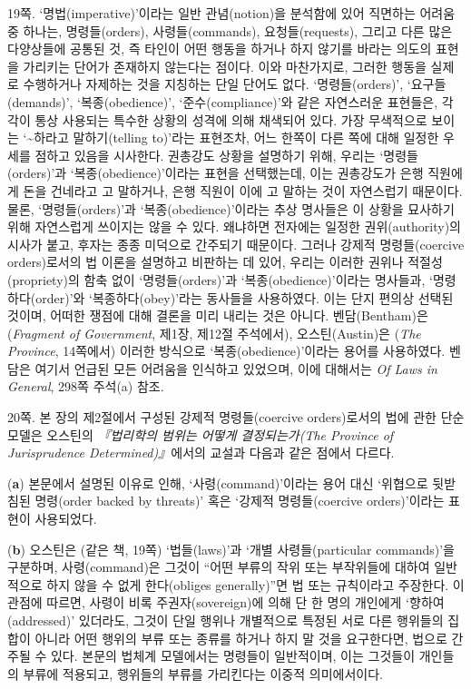 {\noteentry 19쪽.  ‘명법(imperative)’이라는 일반 관념(notion)을 분석함에 있어 직면하는
어려움 중 하나는, 명령들(orders), 사령들(commands), 요청들(requests),
그리고 다른 많은 다양상들에 공통된 것, 즉 타인이 어떤 행동을 하거나 하지
않기를 바라는 의도의 표현을 가리키는 단어가 존재하지 않는다는 점이다.
이와 마찬가지로, 그러한 행동을 실제로 수행하거나 자제하는 것을 지칭하는
단일 단어도 없다. ‘명령들(orders)’, ‘요구들(demands)’,
‘복종(obedience)’, ‘준수(compliance)’와 같은 자연스러운 표현들은, 각각이
통상 사용되는 특수한 상황의 성격에 의해 채색되어 있다. 가장 무색적으로
보이는 ‘\textasciitilde 하라고 말하기(telling to)’라는 표현조차, 어느
한쪽이 다른 쪽에 대해 일정한 우세를 점하고 있음을 시사한다. 권총강도
상황을 설명하기 위해, 우리는 ‘명령들(orders)’과 ‘복종(obedience)’이라는
표현을 선택했는데, 이는 권총강도가 은행 직원에게 돈을 건네라고
고 말하거나, 은행 직원이 이에
고 말하는 것이 자연스럽기 때문이다. 물론,
‘명령들(orders)’과 ‘복종(obedience)’이라는 추상 명사들은 이 상황을
묘사하기 위해 자연스럽게 쓰이지는 않을 수 있다. 왜냐하면 전자에는 일정한
권위(authority)의 시사가 붙고, 후자는 종종 미덕으로 간주되기 때문이다.
그러나 강제적 명령들(coercive orders)로서의 법 이론을 설명하고 비판하는
데 있어, 우리는 이러한 권위나 적절성(propriety)의 함축 없이
‘명령들(orders)’과 ‘복종(obedience)’이라는 명사들과, ‘명령하다(order)’와
‘복종하다(obey)’라는 동사들을 사용하였다. 이는 단지 편의상 선택된
것이며, 어떠한 쟁점에 대해 결론을 미리 내리는 것은 아니다.
벤담(Bentham)은 (\emph{Fragment of Government}, 제1장, 제12절 주석에서),
오스틴(Austin)은 (\emph{The Province}, 14쪽에서) 이러한 방식으로
‘복종(obedience)’이라는 용어를 사용하였다. 벤담은 여기서 언급된 모든
어려움을 인식하고 있었으며, 이에 대해서는 \emph{Of Laws in General},
298쪽 주석(a) 참조.

\noteentry 20쪽.  본 장의 제2절에서 구성된 강제적
명령들(coercive orders)로서의 법에 관한 단순 모델은 오스틴의
\emph{『법리학의 범위는 어떻게 결정되는가(The Province of Jurisprudence
Determined)』}에서의 교설과 다음과 같은 점에서 다르다.

(\textbf{a})  본문에서 설명된 이유로 인해,
‘사령(command)’이라는 용어 대신 ‘위협으로 뒷받침된 명령(order backed by
threats)’ 혹은 ‘강제적 명령들(coercive orders)’이라는 표현이 사용되었다.

(\textbf{b})  오스틴은 (같은 책, 19쪽) ‘법들(laws)’과
‘개별 사령들(particular commands)’을 구분하며, 사령(command)은 그것이
“어떤 부류의 작위 또는 부작위들에 대하여 일반적으로 하지 않을 수 없게
한다(obliges generally)”면 법 또는 규칙이라고 주장한다. 이 관점에
따르면, 사령이 비록 주권자(sovereign)에 의해 단 한 명의 개인에게
‘향하여(addressed)’ 있더라도, 그것이 단일 행위나 개별적으로 특정된 서로
다른 행위들의 집합이 아니라 어떤 행위의 부류 또는 종류를 하거나 하지 말
것을 요구한다면, 법으로 간주될 수 있다. 본문의 법체계 모델에서는
명령들이 일반적이며, 이는 그것들이 개인들의 부류에 적용되고, 행위들의
부류를 가리킨다는 이중적 의미에서이다.

}
